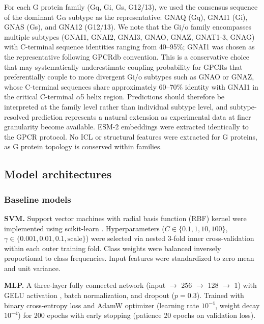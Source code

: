 \documentclass[11pt,a4paper]{article}
\begin{document}
For each G protein family (Gq, Gi, Gs, G12/13), we used the consensus sequence of the dominant G$\alpha$ subtype as the representative: GNAQ (Gq), GNAI1 (Gi), GNAS (Gs), and GNA12 (G12/13). We note that the Gi/o family encompasses multiple subtypes (GNAI1, GNAI2, GNAI3, GNAO, GNAZ, GNAT1-3, GNAG) with C-terminal sequence identities ranging from 40--95\%; GNAI1 was chosen as the representative following GPCRdb convention. This is a conservative choice that may systematically underestimate coupling probability for GPCRs that preferentially couple to more divergent Gi/o subtypes such as GNAO or GNAZ, whose C-terminal sequences share approximately 60--70\% identity with GNAI1 in the critical C-terminal $\alpha$5 helix region. Predictions should therefore be interpreted at the family level rather than individual subtype level, and subtype-resolved prediction represents a natural extension as experimental data at finer granularity become available. ESM-2 embeddings were extracted identically to the GPCR protocol. No ICL or structural features were extracted for G proteins, as G protein topology is conserved within families.

\subsection{Model architectures}

\subsubsection{Baseline models}

\textbf{SVM.} Support vector machines with radial basis function (RBF) kernel were implemented using scikit-learn \cite{pedregosa2011scikit}. Hyperparameters ($C \in \{0.1, 1, 10, 100\}$, $\gamma \in \{0.001, 0.01, 0.1, \text{scale}\}$) were selected via nested 3-fold inner cross-validation within each outer training fold. Class weights were balanced inversely proportional to class frequencies. Input features were standardized to zero mean and unit variance.

\textbf{MLP.} A three-layer fully connected network (input $\rightarrow$ 256 $\rightarrow$ 128 $\rightarrow$ 1) with GELU activation \cite{hendrycks2016gaussian}, batch normalization, and dropout ($p=0.3$). Trained with binary cross-entropy loss and AdamW optimizer \cite{loshchilov2019decoupled} (learning rate $10^{-4}$, weight decay $10^{-4}$) for 200 epochs with early stopping (patience 20 epochs on validation loss).
\end{document}
